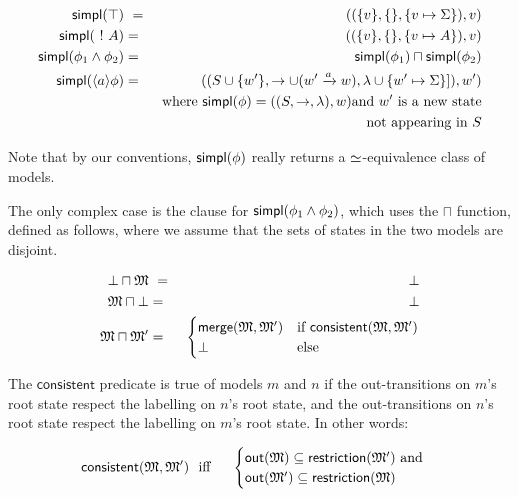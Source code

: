\begin{eqnarray*}
  \mathsf{simpl}(\top) &\ = \ & ( (\{v\}, \{\}, \{v \mapsto \Sigma\}), v)  \\
  \mathsf{simpl}(\ ! \  A) & = & ( (\{v\}, \{\}, \{v \mapsto A\}), v)  \\
  \mathsf{simpl}(\phi_1 \land \phi_2) & = & \mathsf{simpl}(\phi_1) \sqcap \mathsf{simpl}(\phi_2)  \\
  \mathsf{simpl}(\langle a \rangle \phi) 
     & = & ( (S \cup \{w'\}, \rightarrow \cup (w' \xrightarrow{a} w), \lambda \cup \{w' \mapsto \Sigma\}]), w')  \\
		& & \mbox{where }\mathsf{simpl}(\phi) = ( (S, \rightarrow, \lambda), w) \mbox{and } w' \mbox{ is a new state} \\
                &&  \mbox{not appearing in }S 
\end{eqnarray*}

\NI Note that by our conventions, $\mathsf{simpl}(\phi)$ really returns a
$\simeq$-equivalence class of models.

The only complex case is the clause for $\mathsf{simpl}(\phi_1 \land \phi_2)$,
which uses the $\sqcap$ function, defined as follows, where we assume
that the sets of states in the two models are disjoint.

\begin{eqnarray*}
  \bot \sqcap \MMM  &\ =\ &  \bot  \\
  \MMM \sqcap \bot      & = &  \bot  
     \\
  \MMM \sqcap \MMM'
     & = & 
  \begin{cases}
    \mathsf{merge}(\MMM, \MMM') & \text{if}\ \mathsf{consistent}(\MMM, \MMM') \\
    \bot & \text{else}
  \end{cases}
\end{eqnarray*}

\NI The $\mathsf{consistent}$ predicate is true of models $m$ and $n$ if
the out-transitions on $m$'s root state respect the labelling on $n$'s
root state, and the out-transitions on $n$'s root state respect the
labelling on $m$'s root state. In other words:

\begin{eqnarray*}
  \mathsf{consistent}(\frak{M}, \frak{M}') 
     &\ \mbox{ iff }\ & 
  \begin{cases}
    \mathsf{out}(\frak{M}) \subseteq \mathsf{restriction}(\frak{M}') \mbox{ and}  \\
    \mathsf{out}(\frak{M}') \subseteq \mathsf{restriction}(\frak{M}) 
  \end{cases}
\end{eqnarray*}

